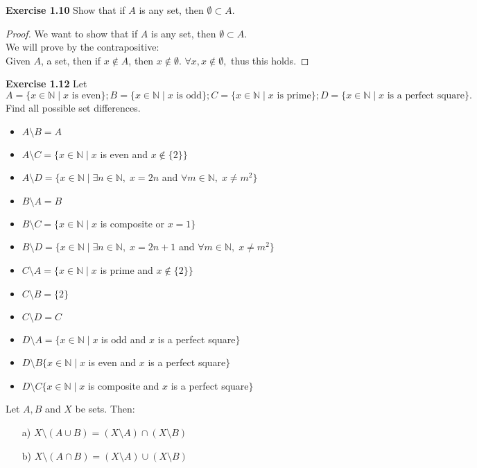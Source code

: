 \documentclass[11pt]{article}
\begin{document}
\noindent\textbf{Exercise 1.10}
Show that if $A$ is any set, then $\emptyset\subset A$.
\begin{proof}
We want to show that if $A$ is any set, then $\emptyset\subset A$.\\
We will prove by the contrapositive: \\
Given $A$, a set, then if $x \notin A$, then $x \notin \emptyset$. $\forall x, x \notin \emptyset,$ thus this holds. 
\end{proof}
\noindent\textbf{Exercise 1.12} 
Let $A=\{x\in \mathds{N} \mid x\text{ is even}\}; B=\{x\in \mathds{N} \mid x\text{ is odd}\}; C=\{x\in \mathds{N} \mid x\text{ is prime}\}; D=\{x\in \mathds{N} \mid x\text{ is a perfect square}\}.$
Find all possible set differences.
\begin{itemize}
    \item $A \setminus B = A$
    \item $A \setminus C = \{x \in \mathds{N} \mid x$ is even and $x \notin \{2\}\}$
    \item $A \setminus D = \{x \in \mathds{N} \mid \exists n \in \mathds{N},\; x = 2n $ and $ \forall m \in \mathds{N},\; x\neq m^2\} $
    \item $B \setminus A = B$
    \item $B \setminus C = \{x \in \mathds{N} \mid x $ is composite or $ x = 1\}$
    \item $B \setminus D = \{x \in \mathds{N} \mid \exists n \in \mathds{N},\; x = 2n + 1 $ and $ \forall m \in \mathds{N},\; x\neq m^2\} $
    \item $C \setminus A = \{x \in \mathds{N} \mid x$ is prime and $ x \notin \{2\}\}$
    \item $C \setminus B = \{2\}$
    \item $C \setminus D = C$
    \item $D \setminus A = \{x \in \mathds{N} \mid x$ is odd and $x$ is a perfect square$\}$
    \item $D \setminus B  \{x \in \mathds{N} \mid x$ is even and $x$ is a perfect square$\}$
    \item $D \setminus C \{x \in \mathds{N} \mid x$ is composite and $x$ is a perfect square$\}$
\end{itemize}
\begin{theorem}[1.13]
Let $A,B$ and $X$ be sets.  Then:
\begin{enumerate}
\item[a)]
$X\setminus (A\cup B)=(X\setminus A)\cap (X\setminus B)$

\item[b)]
$X\setminus (A\cap B)=(X\setminus A)\cup (X\setminus B)$
\end{enumerate}
\end{theorem}
\end{document}
